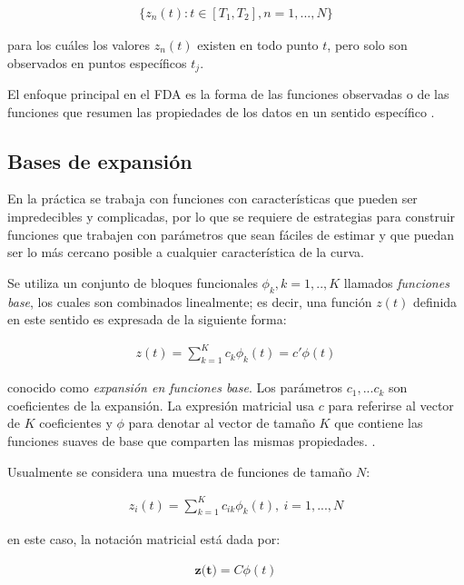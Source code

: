 \documentclass[
]{book}
\begin{document}
\begin{align*}
    \{z_n(t):t\in[T_1,T_2],n=1,...,N\}
\end{align*}

para los cuáles los valores \(z_n(t)\) existen en todo punto \(t\), pero solo son observados en puntos específicos \(t_j\).

El enfoque principal en el FDA es la forma de las funciones observadas o de las funciones que resumen las propiedades de los datos en un sentido específico \citep{kokoska}.

\hypertarget{bases-de-expansiuxf3n}{%
\subsection*{Bases de expansión}\label{bases-de-expansiuxf3n}}

En la práctica se trabaja con funciones con características que pueden ser impredecibles y complicadas, por lo que se requiere de estrategias para construir funciones que trabajen con parámetros que sean fáciles de estimar y que puedan ser lo más cercano posible a cualquier característica de la curva.

Se utiliza un conjunto de bloques funcionales \(\phi_k,k=1,..,K\) llamados \emph{funciones base}, los cuales son combinados linealmente; es decir, una función \(z(t)\) definida en este sentido es expresada de la siguiente forma:

\begin{align*}
    z(t)=\sum_{k=1}^Kc_k\phi_k(t)=c'\phi(t)
\end{align*}

conocido como \emph{expansión en funciones base}. Los parámetros \(c_1,...c_k\) son coeficientes de la expansión. La expresión matricial usa \(c\) para referirse al vector de \(K\) coeficientes y \(\phi\) para denotar al vector de tamaño \(K\) que contiene las funciones suaves de base que comparten las mismas propiedades. \citep{programsay}.

Usualmente se considera una muestra de funciones de tamaño \(N\):

\begin{align*}
    z_i(t)=\sum_{k=1}^Kc_{ik}\phi_k(t), \ i=1,...,N
\end{align*}

en este caso, la notación matricial está dada por:

\begin{align*}
    \textbf{z(t)}=C\phi(t)
\end{align*}
\end{document}
